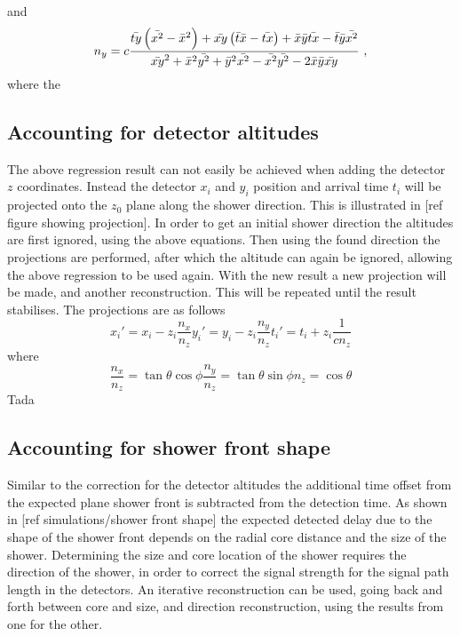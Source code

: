 %
and
%
\begin{equation}
n_y = c \frac{\mean{t y} \left( \mean{x^2} - \mean{x}^2 \right) +
              \mean{x y} \left( \mean{t} \mean{x} - \mean{t x} \right) +
              \mean{x} \mean{y} \mean{t x} - \mean{t} \mean{y} \mean{x^2}}
             {\mean{x y}^2 + \mean{x}^2 \mean{y^2} + \mean{y}^2 \mean{x^2} -
              \mean{x^2} \mean{y^2} - 2 \mean{x} \mean{y} \mean{x y}} \ ,
\end{equation}
%
where the






\subsection{Accounting for detector altitudes}

The above regression result can not easily be achieved when adding the detector $z$ coordinates. Instead the detector $x_i$ and $y_i$ position and arrival time $t_i$ will be projected onto the $z_0$ plane along the shower direction. This is illustrated in [ref figure showing projection]. In order to get an initial shower direction the altitudes are first ignored, using the above equations. Then using the found direction the projections are performed, after which the altitude can again be ignored, allowing the above regression to be used again. With the new result a new projection will be made, and another reconstruction. This will be repeated until the result stabilises. The projections are as follows
%
\begin{equation}
    x_i' = x_i - z_i \frac{n_x}{n_z}
    y_i' = y_i - z_i \frac{n_y}{n_z}
    t_i' = t_i + z_i \frac{1}{c n_z}
\end{equation}
%
where
%
\begin{equation}
    \frac{n_x}{n_z} = \tan \theta \cos \phi
    \frac{n_y}{n_z} = \tan \theta \sin \phi
    n_z = \cos \theta
\end{equation}
%
Tada

\subsection{Accounting for shower front shape}

Similar to the correction for the detector altitudes the additional time offset from the expected plane shower front is subtracted from the detection time. As shown in [ref simulations/shower front shape] the expected detected delay due to the shape of the shower front depends on the radial core distance and the size of the shower. Determining the size and core location of the shower requires the direction of the shower, in order to correct the signal strength for the signal path length in the detectors. An iterative reconstruction can be used, going back and forth between core and size, and direction reconstruction, using the results from one for the other.

